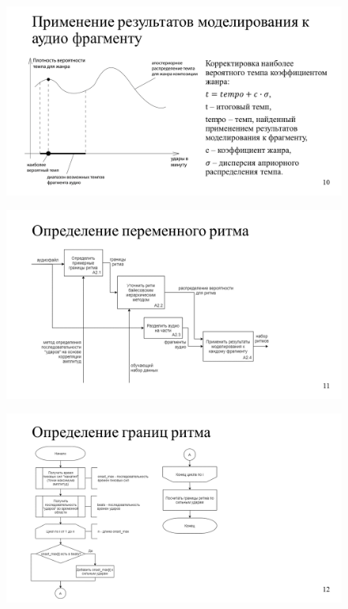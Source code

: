 \begin{figure}[h!]
	\begin{center}
		\includegraphics[angle=90,scale=0.75]{slides/Slide10.png}
	\end{center}
\end{figure}

\begin{figure}[h!]
	\begin{center}
		\includegraphics[angle=90,scale=0.75]{slides/Slide11.png}
	\end{center}
\end{figure}

\begin{figure}[h!]
	\begin{center}
		\includegraphics[angle=90,scale=0.75]{slides/Slide12.png}
	\end{center}
\end{figure}

